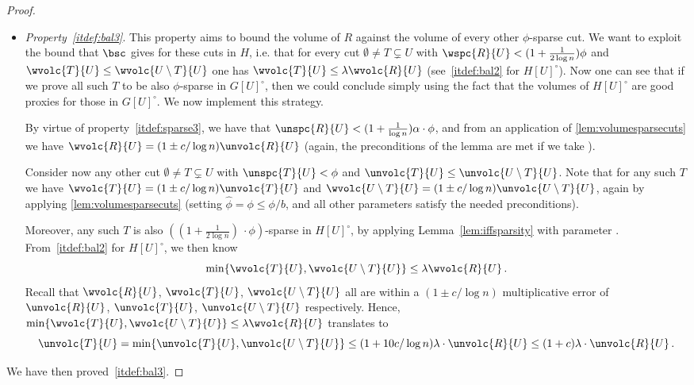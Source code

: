 \begin{proof}[Proof]
\begin{itemize}
		
		
		\item \textit{Property~\eqref{itdef:bal3}}. This property aims to bound the volume of $R$ against the volume of every other $\phi$-sparse cut. We want to exploit the bound that $\bsc$ gives for these cuts in $H$, i.e. that for every cut $\emptyset \neq T \subsetneq U$ with $\wspc{R}{U} <  (1+\frac{1}{2\log n})  \phi$ and $\wvolc{T}{U} \le \wvolc{U \setminus T}{U}$ one has $\wvolc{T}{U} \le \lambda \wvolc{R}{U} $ (see~\eqref{itdef:bal2} for $H[U]^\circ$). Now one can see that if we prove all such $T$ to be also $\phi$-sparse in $G[U]^\circ$, then we could conclude simply using the fact that the volumes of $H[U]^\circ$ are good proxies for those in $G[U]^\circ$. We now implement this strategy.
		
		By virtue of property~\eqref{itdef:sparse3}, we have that $\unspc{R}{U}<(1+\frac{1}{\log n})\alpha \cdot \phi$, and from an application of \cref{lem:volumesparsecuts} we have $\wvolc{R}{U}= (1 \pm c/\log n)\unvolc{R}{U}$ (again, the preconditions of the lemma are met if we take ).
		
		Consider now any other cut $\emptyset \neq T \subsetneq U$ with $\unspc{T}{U} < \phi$ and $\unvolc{T}{U} \le \unvolc{U \setminus T}{U}$. Note that for any such $T$ we have $\wvolc{T}{U}= (1 \pm c/\log n)\unvolc{T}{U}$ and $\wvolc{U \setminus T}{U}= (1 \pm c/\log n)\unvolc{U \setminus T}{U}$, again by applying \cref{lem:volumesparsecuts} (setting $\hat{\phi} =\phi \le \phi/b$, and all other parameters satisfy the needed preconditions).
		
		Moreover, any such $T$ is also $((1+\frac{1}{2\log n})\ \cdot \phi)$-sparse in $H[U]^\circ$, by applying Lemma~\ref{lem:iffsparsity} with parameter . From~\eqref{itdef:bal2} for $H[U]^\circ$, we then know
		\begin{equation*}
			\min\{\wvolc{T}{U},\wvolc{U \setminus T}{U}\} \le \lambda \wvolc{R}{U} \, .
		\end{equation*}
		Recall that $\wvolc{R}{U}$, $\wvolc{T}{U}$, $\wvolc{U \setminus T}{U}$ all are within a $(1 \pm c/\log n)$ multiplicative error of $\unvolc{R}{U}$, $\unvolc{T}{U}$, $\unvolc{U \setminus T}{U}$ respectively. Hence, $\min\{\wvolc{T}{U},\wvolc{U \setminus T}{U}\} \le \lambda \wvolc{R}{U}$ translates to
		\begin{equation*}
			\unvolc{T}{U} = \min\{\unvolc{T}{U},\unvolc{U \setminus T}{U}\} \le (1+10c/\log n) \lambda\cdot \unvolc{R}{U} \le (1+c) \lambda\cdot \unvolc{R}{U} \, .
		\end{equation*}
	\end{itemize}
	\noindent
	We have then proved~\eqref{itdef:bal3}.
	\end{proof}